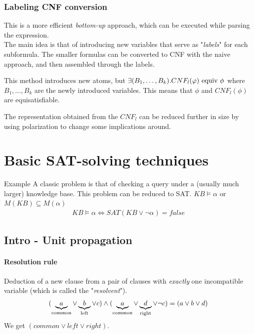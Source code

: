 \documentclass{article}
\begin{document}
\subsubsection{Labeling CNF conversion}
This is a more efficient \textit{bottom-up} approach, which can be executed while parsing the expression.\\
The main idea is that of introducing new variables that serve as "\textit{labels}" for each subformula. The smaller formulas can be converted to CNF with the naive approach, and then assembled through the labels.

This method introduces new atoms, but $\exists(B_1,\dots,B_k).CNF_l(\varphi)\ \te{equiv}\ \phi$ where $B_1,\dots,B_k$ are the newly introduced variables. This means that $\phi$ and $CNF_l(\phi)$ are equisatisfiable.

The representation obtained from the $CNF_l$ can be reduced  further in size by using polarization to change some implications around.

\section{Basic SAT-solving techniques}
\begin{esempio}{Example}
    A classic problem is that of checking a query under a (usually much larger) knowledge base. This problem can be reduced to SAT. $KB\models\alpha$ or $M(KB)\subseteq M(\alpha)$
    \begin{align*}
        KB\models \alpha \iff SAT(KB \vee \neg \alpha) = false
    \end{align*}
\end{esempio}

\subsection{Intro - Unit propagation}
\paragraph{Resolution rule} Deduction of a new clause from a pair of clauses with \textit{exactly} one incompatible variable (which is called the "\textit{resolvent}").
\begin{align*}
    (\underbrace{a}_{\text{common}}\vee \underbrace{b}_{\text{left}}\vee c) \wedge (\underbrace{a}_{\text{common}}\vee \underbrace{d}_{\text{right}}\vee \neg c) = (a\vee b\vee d)
\end{align*}
We get $(common \vee left \vee right)$.
\end{document}
